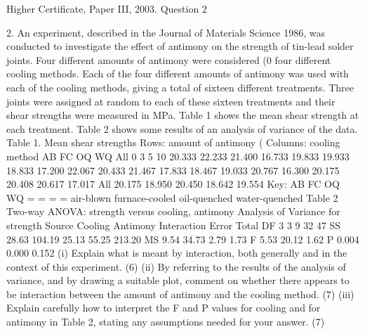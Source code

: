 \documentclass[a4paper,12pt]{article}
\begin{document}
Higher Certificate, Paper III, 2003. Question 2
\begin{framed}
2.
An experiment, described in the Journal of Materials Science 1986, was conducted to
investigate the effect of antimony on the strength of tin-lead solder joints. Four
different amounts of antimony were considered (0%
four different cooling methods. Each of the four different amounts of antimony was
used with each of the cooling methods, giving a total of sixteen different treatments.
Three joints were assigned at random to each of these sixteen treatments and their
shear strengths were measured in MPa.
Table 1 shows the mean shear strength at each treatment. Table 2 shows some results
of an analysis of variance of the data.
Table 1. Mean shear strengths
Rows: amount of antimony (%
Columns: cooling method
AB
FC
OQ
WQ
All
0
3
5
10 20.333
22.233
21.400
16.733 19.833
19.933
18.833
17.200 22.067
20.433
21.467
17.833 18.467
19.033
20.767
16.300 20.175
20.408
20.617
17.017
All 20.175 18.950 20.450 18.642 19.554
Key: AB
FC
OQ
WQ
=
=
=
=
air-blown
furnace-cooled
oil-quenched
water-quenched
Table 2
Two-way ANOVA: strength versus cooling, antimony
Analysis of Variance for strength
Source
Cooling
Antimony
Interaction
Error
Total
DF
3
3
9
32
47
SS
28.63
104.19
25.13
55.25
213.20
MS
9.54
34.73
2.79
1.73
F
5.53
20.12
1.62
P
0.004
0.000
0.152
(i) Explain what is meant by interaction, both generally and in the context of this
experiment.
(6)
(ii) By referring to the results of the analysis of variance, and by drawing a suitable
plot, comment on whether there appears to be interaction between the amount
of antimony and the cooling method.
(7)
(iii) Explain carefully how to interpret the F and P values for cooling and for
antimony in Table 2, stating any assumptions needed for your answer.
(7)
\end{framed}
\end{document}
